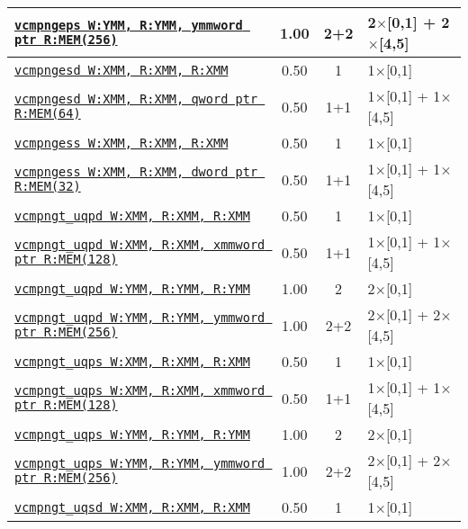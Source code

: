 \documentclass[a4paper,english,fontsize=9]{scrartcl}
\begin{document}
\begin{longtable}{p{}ccL{.25\textwidth}}
  \midrule
  \texttt{\href{https://felixcloutier.com/x86/CMPPS.html}{vcmpngeps W:YMM, R:YMM, ymmword ptr R:MEM(256)}} & 1.00 & 2+2 & 2\(\times\)[0,1] + 2\(\times\)[4,5] \\
  \midrule
  \texttt{\href{https://felixcloutier.com/x86/CMPSD.html}{vcmpngesd W:XMM, R:XMM, R:XMM}} & 0.50 & 1 & 1\(\times\)[0,1] \\
  \midrule
  \texttt{\href{https://felixcloutier.com/x86/CMPSD.html}{vcmpngesd W:XMM, R:XMM, qword ptr R:MEM(64)}} & 0.50 & 1+1 & 1\(\times\)[0,1] + 1\(\times\)[4,5] \\
  \midrule
  \texttt{\href{https://felixcloutier.com/x86/CMPSS.html}{vcmpngess W:XMM, R:XMM, R:XMM}} & 0.50 & 1 & 1\(\times\)[0,1] \\
  \midrule
  \texttt{\href{https://felixcloutier.com/x86/CMPSS.html}{vcmpngess W:XMM, R:XMM, dword ptr R:MEM(32)}} & 0.50 & 1+1 & 1\(\times\)[0,1] + 1\(\times\)[4,5] \\
  \midrule
  \texttt{\href{https://felixcloutier.com/x86/CMPPD.html}{vcmpngt\_uqpd W:XMM, R:XMM, R:XMM}} & 0.50 & 1 & 1\(\times\)[0,1] \\
  \midrule
  \texttt{\href{https://felixcloutier.com/x86/CMPPD.html}{vcmpngt\_uqpd W:XMM, R:XMM, xmmword ptr R:MEM(128)}} & 0.50 & 1+1 & 1\(\times\)[0,1] + 1\(\times\)[4,5] \\
  \midrule
  \texttt{\href{https://felixcloutier.com/x86/CMPPD.html}{vcmpngt\_uqpd W:YMM, R:YMM, R:YMM}} & 1.00 & 2 & 2\(\times\)[0,1] \\
  \midrule
  \texttt{\href{https://felixcloutier.com/x86/CMPPD.html}{vcmpngt\_uqpd W:YMM, R:YMM, ymmword ptr R:MEM(256)}} & 1.00 & 2+2 & 2\(\times\)[0,1] + 2\(\times\)[4,5] \\
  \midrule
  \texttt{\href{https://felixcloutier.com/x86/CMPPS.html}{vcmpngt\_uqps W:XMM, R:XMM, R:XMM}} & 0.50 & 1 & 1\(\times\)[0,1] \\
  \midrule
  \texttt{\href{https://felixcloutier.com/x86/CMPPS.html}{vcmpngt\_uqps W:XMM, R:XMM, xmmword ptr R:MEM(128)}} & 0.50 & 1+1 & 1\(\times\)[0,1] + 1\(\times\)[4,5] \\
  \midrule
  \texttt{\href{https://felixcloutier.com/x86/CMPPS.html}{vcmpngt\_uqps W:YMM, R:YMM, R:YMM}} & 1.00 & 2 & 2\(\times\)[0,1] \\
  \midrule
  \texttt{\href{https://felixcloutier.com/x86/CMPPS.html}{vcmpngt\_uqps W:YMM, R:YMM, ymmword ptr R:MEM(256)}} & 1.00 & 2+2 & 2\(\times\)[0,1] + 2\(\times\)[4,5] \\
  \midrule
  \texttt{\href{https://felixcloutier.com/x86/CMPSD.html}{vcmpngt\_uqsd W:XMM, R:XMM, R:XMM}} & 0.50 & 1 & 1\(\times\)[0,1] \\

\end{longtable}
\end{document}
